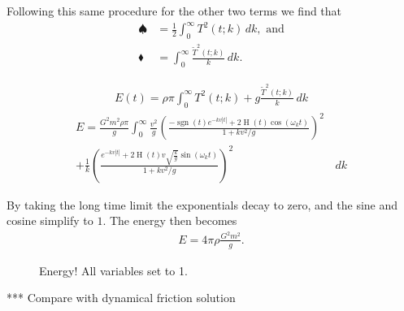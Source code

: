 \documentclass[12pt]{article}
\DeclareMathOperator{\sgn}{sgn}
\DeclareMathOperator{\Heavi}{H}
\begin{document}
Following this same procedure for the other two terms we find that 
\begin{align*}
\spadesuit &= \frac{1}{2} \int_0^\infty T^2(t;k) \, dk, \text{ and} \\
\blacklozenge &= \int_0^\infty \frac{\widetilde{T}^2(t;k)}{k} \, dk.
\end{align*}



\begin{align*}
E(t) = \rho \pi \int_0^\infty T^2(t;k) + g \frac{\widetilde{T}^2(t;k)}{k} \, dk
\end{align*}
\begin{equation}
\label{eq:fullenergy}
\begin{split}
E = \frac{G^2 m^2 \rho \pi}{g} \int_0^\infty \frac{v^2}{g} \left( \frac{- \sgn(t) e^{-kv |t|} + 2 \Heavi(t) \cos(\omega_k t)}{1+kv^2/g} \right)^2& \\
+ \frac{1}{k} \left( \frac{e^{-kv |t|} + 2 \Heavi(t) v \sqrt{\frac{k}{g}} \sin(\omega_k t)}{1+kv^2/g} \right)^2& \, dk
\end{split}
\end{equation}

By taking the long time limit the exponentials decay to zero, and the sine and cosine simplify to $1$. The energy then becomes
\begin{align}
\label{eq:energy}
E = 4 \pi \rho \frac{G^2 m^2}{g}.
\end{align}


\begin{figure}[p]
 
 \caption{Energy! All variables set to 1.}
 \label{fig:analyticenergy}
\end{figure}

***
Compare with dynamical friction solution
\end{document}
